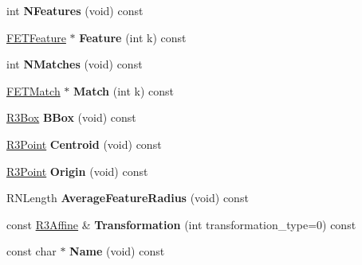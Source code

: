 \begin{DoxyCompactItemize}
\item 
int {\bfseries N\+Features} (void) const \hypertarget{struct_f_e_t_shape_a8c52d868b95b75942f4cca4725851784}{}\label{struct_f_e_t_shape_a8c52d868b95b75942f4cca4725851784}

\item 
\hyperlink{struct_f_e_t_feature}{F\+E\+T\+Feature} $\ast$ {\bfseries Feature} (int k) const \hypertarget{struct_f_e_t_shape_a14f1f3f367d111c178e5ce77a0124843}{}\label{struct_f_e_t_shape_a14f1f3f367d111c178e5ce77a0124843}

\item 
int {\bfseries N\+Matches} (void) const \hypertarget{struct_f_e_t_shape_a22761e7804f7ea33064704f498c12785}{}\label{struct_f_e_t_shape_a22761e7804f7ea33064704f498c12785}

\item 
\hyperlink{struct_f_e_t_match}{F\+E\+T\+Match} $\ast$ {\bfseries Match} (int k) const \hypertarget{struct_f_e_t_shape_ae94a4fe7300bb0760a36da427caff213}{}\label{struct_f_e_t_shape_ae94a4fe7300bb0760a36da427caff213}

\item 
\hyperlink{class_r3_box}{R3\+Box} {\bfseries B\+Box} (void) const \hypertarget{struct_f_e_t_shape_af161ce6cb529aebe0b678b3458d37908}{}\label{struct_f_e_t_shape_af161ce6cb529aebe0b678b3458d37908}

\item 
\hyperlink{class_r3_point}{R3\+Point} {\bfseries Centroid} (void) const \hypertarget{struct_f_e_t_shape_a49057c90e65ee17bf79e38388e132144}{}\label{struct_f_e_t_shape_a49057c90e65ee17bf79e38388e132144}

\item 
\hyperlink{class_r3_point}{R3\+Point} {\bfseries Origin} (void) const \hypertarget{struct_f_e_t_shape_a486c39ed5a54c744517d66ed5cad76fa}{}\label{struct_f_e_t_shape_a486c39ed5a54c744517d66ed5cad76fa}

\item 
R\+N\+Length {\bfseries Average\+Feature\+Radius} (void) const \hypertarget{struct_f_e_t_shape_a3e6647906a32fd2b912931f2f4f0f619}{}\label{struct_f_e_t_shape_a3e6647906a32fd2b912931f2f4f0f619}

\item 
const \hyperlink{class_r3_affine}{R3\+Affine} \& {\bfseries Transformation} (int transformation\+\_\+type=0) const \hypertarget{struct_f_e_t_shape_af54dc7a2c88eef0dccf3542db018ff3c}{}\label{struct_f_e_t_shape_af54dc7a2c88eef0dccf3542db018ff3c}

\item 
const char $\ast$ {\bfseries Name} (void) const \hypertarget{struct_f_e_t_shape_a6be6f7250d26715776cd8bc78faca06b}{}\label{struct_f_e_t_shape_a6be6f7250d26715776cd8bc78faca06b}


\end{DoxyCompactItemize}
